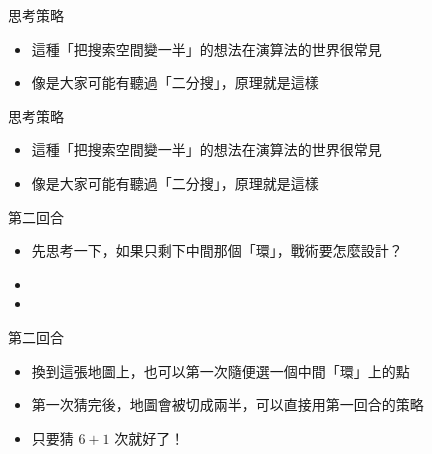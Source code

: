 \begin{frame}{思考策略}
  \begin{itemize}
    \item 這種「把搜索空間變一半」的想法在演算法的世界很常見
    \item 像是大家可能有聽過「二分搜」，原理就是這樣
  \end{itemize}
\end{frame}

\begin{frame}{思考策略}
  \begin{itemize}
    \item 這種「把搜索空間變一半」的想法在演算法的世界很常見
    \item 像是大家可能有聽過「二分搜」，原理就是這樣
  \end{itemize}
\end{frame}

\begin{frame}{第二回合}
  \begin{itemize}
    \item 先思考一下，如果只剩下中間那個「環」，戰術要怎麼設計？
    \item{}
    \item{}
  \end{itemize}
\end{frame}

\begin{frame}{第二回合}
  \begin{itemize}
    \item 換到這張地圖上，也可以第一次隨便選一個中間「環」上的點
    \item 第一次猜完後，地圖會被切成兩半，可以直接用第一回合的策略
    \item 只要猜 $6 + 1$ 次就好了！
  \end{itemize}
\end{frame}

